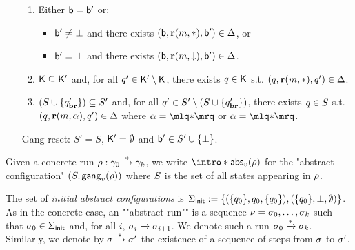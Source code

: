 \begin{definition}
\begin{enumerate}
\begin{enumerate}[label=(\roman*)]
		\item\label{item:external_broadcast_boss}Either $\mathsf{b} = \mathsf{b}'$ or:
		\begin{itemize} 
			\item $\mathsf{b}' \ne \bot$ and there exists $(\mathsf{b}, \textbf{r}(m, {*}), \mathsf{b}') \in \Delta$, or
			\item $\mathsf{b}' = \bot$ and there exists $(\mathsf{b}, \textbf{r}(m, \downarrow), \mathsf{b}') \in \Delta$.
		\end{itemize}

		\item\label{item:external_broadcast_clique}$\mathsf{K} \subseteq \mathsf{K}'$ and, for all $q' \in \mathsf{K}' \setminus \mathsf{K}$, there exists $q \in \mathsf{K}$ s.t. $(q, \textbf{r}(m, {*}), q') \in \Delta$.
		
		\item\label{item:external_broadcast_covset}$(S \cup \{q_{\textbf{br}}'\}) \subseteq S'$ and, for all $q' \in S' \setminus (S \cup \{q_{\textbf{br}}'\})$, there exists $q \in S$ s.t. $(q, \textbf{r}(m, \alpha), q') \in \Delta$ where $\anact = \quotemarks{\dummyact}$ or $\anact = \quotemarks{\dummyact}$.
	\end{enumerate}
	\item[Gang reset:] $S' = S$, $\mathsf{K}' = \emptyset$ and $\mathsf{b}' \in S' \cup \{\bot\}$. 
	\item[] 
\end{enumerate}


Given a concrete run $\rho: \gamma_0 \xrightarrow{*} \gamma_k$, we write \AP  $\intro*\absproj{\aval}{\run}$ for the "abstract configuration" $(S, \mathsf{gang}_{v}(\rho))$ where $S$ is the set of all states appearing in $\rho$. 

The set of \emph{initial abstract configurations} is $\Sigma_{\mathsf{init}} := \{(\{q_0\}, q_0, \{q_0\}), (\{q_0\}, \bot, \emptyset)\}$.  
As in the concrete case, an ""abstract run"" is a sequence $\nu = \sigma_0, \dots, \sigma_k$ such that $\sigma_0 \in \Sigma_{\mathsf{init}}$ and, for all $i$, $\sigma_i \xrightarrow{} \sigma_{i+1}$. We denote such a run $\sigma_0 \xrightarrow{*} \sigma_k$. Similarly, we denote by $\sigma \xrightarrow{*} \sigma'$ the existence of a sequence of steps from $\sigma$ to $\sigma'$.
\end{definition}


